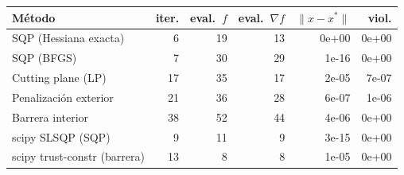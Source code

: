 \begin{tabular}{lrrrrr}\toprule
M\'etodo & iter. & eval.\ $f$ & eval.\ $\nabla f$ & $\|x-x^\ast\|$ & viol.\\\midrule
SQP (Hessiana exacta) & 6 & 19 & 13 & 0e+00 & 0e+00\\
SQP (BFGS) & 7 & 30 & 29 & 1e-16 & 0e+00\\
Cutting plane (LP) & 17 & 35 & 17 & 2e-05 & 7e-07\\
Penalización exterior & 21 & 36 & 28 & 6e-07 & 1e-06\\
Barrera interior & 38 & 52 & 44 & 4e-06 & 0e+00\\
scipy SLSQP (SQP) & 9 & 11 & 9 & 3e-15 & 0e+00\\
scipy trust-constr (barrera) & 13 & 8 & 8 & 1e-05 & 0e+00\\
\bottomrule\end{tabular}
